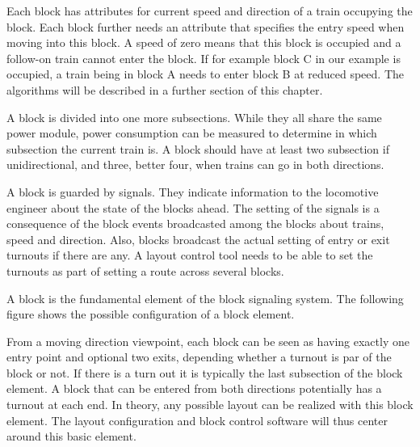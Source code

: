 Each block has attributes for current speed and direction of a train occupying the block. Each block further needs an attribute that specifies the entry speed when moving into this block. A speed of zero means that this block is occupied and a follow-on train cannot enter the block. If for example block C in our example is occupied, a train being in block A needs to enter block B at reduced speed. The algorithms will be described in a further section of this chapter.

A block is divided into one more subsections. While they all share the same power module, power consumption can be measured to determine in which subsection the current train is. A block should have at least two subsection if unidirectional, and three, better four, when trains can go in both directions.

A block is guarded by signals. They indicate information to the locomotive engineer about the state of the blocks ahead. The setting of the signals is a consequence of the block events broadcasted among the blocks about trains, speed and direction. Also, blocks broadcast the actual setting of entry or exit turnouts if there are any. A layout control tool needs to be able to set the turnouts as part of setting a route across several blocks.


A block is the fundamental element of the block signaling system. The following figure shows the possible configuration of a block  element.

\begin{center}
\end{center}


From a moving direction viewpoint, each block can be seen as having exactly one entry point and optional two exits, depending whether a turnout is par of the block or not. If there is a turn out it is typically the last subsection of the block element. A block that can be entered from both directions potentially has a turnout at each end. In theory, any possible layout can be realized with this block element. The layout configuration and block control software will thus center around this basic element.

